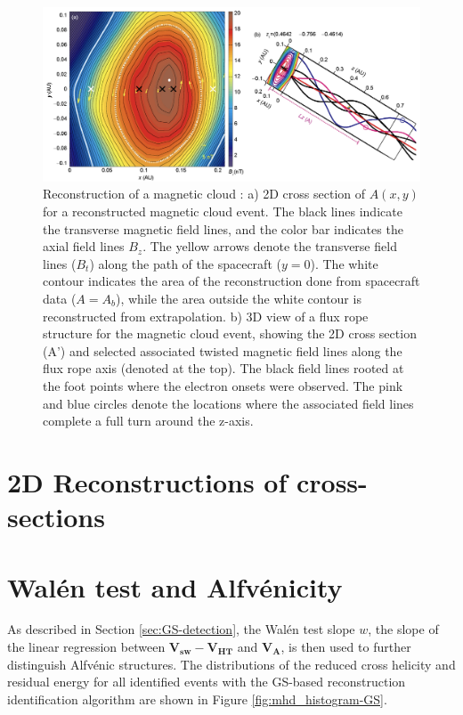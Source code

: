 \begin{figure}[ht!]
    \centering
    \includegraphics[width=\textwidth]{Figures/Reconstructions/Hu2015_GSreconstruction.png}
    \caption[GS 2D reconstruction of a magnetic cloud]{Reconstruction of a magnetic cloud \citep{Hu:2015}: a) 2D cross section of $A(x,y)$ for a reconstructed magnetic cloud event. The black lines indicate the transverse magnetic field lines, and the color bar indicates the axial field lines $B_z$. The yellow arrows denote the transverse field lines ($B_t$) along the path of the spacecraft ($y=0$). The white contour indicates the area of the reconstruction done from spacecraft data ($A=A_b$), while the area outside the white contour is reconstructed from extrapolation. b) 3D view of a flux rope structure for the magnetic cloud event, showing the 2D cross section (A') and selected associated twisted magnetic field lines along the flux rope axis (denoted at the top). The black field lines  rooted at the foot points where the electron onsets were observed. The pink and blue circles denote the locations where the associated field lines complete a full turn around the z-axis.}
    \label{fig:GSreconstruction_Hu2015}
\end{figure}


\section{2D Reconstructions of cross-sections}

\section{Wal\'en test and Alfv\'enicity}
As described in Section \ref{sec:GS-detection}, the Wal\'en test slope $w$, the slope of the linear regression between $\mathbf{V_{sw}} - \mathbf{V_{HT}}$ and $\mathbf{V_A}$, is then used to further distinguish Alfv\'enic structures. The distributions of the reduced cross helicity and residual energy for all identified events with the GS-based reconstruction identification algorithm are shown in Figure \ref{fig:mhd_histogram-GS}.

